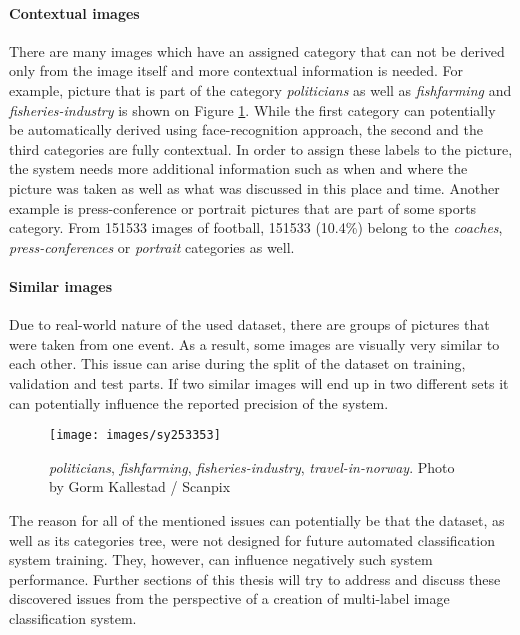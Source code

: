 \paragraph{Contextual images}
There are many images which have an assigned category that can not be derived only from the image itself and more contextual information is needed. For example, picture that is part of the category \textit{politicians} as well as \textit{fishfarming} and \textit{fisheries-industry} is shown on Figure \ref{fig:politician-fish}. While the first category can potentially be automatically derived using face-recognition approach, the second and the third categories are fully contextual. In order to assign these labels to the picture, the system needs more additional information such as when and where the picture was taken as well as what was discussed in this place and time. Another example is press-conference or portrait pictures that are part of some sports category. From 151533 images of football, 151533 (10.4\%) belong to the \textit{coaches}, \textit{press-conferences} or \textit{portrait} categories as well.

\paragraph{Similar images}
Due to real-world nature of the used dataset, there are groups of pictures that were taken from one event. As a result, some images are visually very similar to each other. This issue can arise during the split of the dataset on training, validation and test parts. If two similar images will end up in two different sets it can potentially influence the reported precision of the system.

\begin{figure}[h]
    \centering
    \texttt{[image: images/sy253353]}
    \caption[Example of contextual labeled images]{\textit{politicians}, \textit{fishfarming}, \textit{fisheries-industry}, \textit{travel-in-norway}. Photo by Gorm Kallestad / Scanpix}
    \label{fig:politician-fish}
\end{figure}

The reason for all of the mentioned issues can potentially be that the dataset, as well as its categories tree, were not designed for future automated classification system training. They, however, can influence negatively such system performance. Further sections of this thesis will try to address and discuss these discovered issues from the perspective of a creation of multi-label image classification system.

